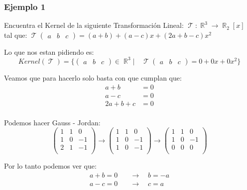 \documentclass[12pt]{report}                                    %
\DeclareMathOperator \Real {\mathbb{R}}                         %
\DeclareMathOperator \LinealTransformation {\mathcal{T}}        %
\DeclareMathOperator \LT {\mathcal{T}}                          %
\newcommand{\pVector}[1]{                                       %
        \ensuremath{\begin{pmatrix}#1\end{pmatrix}}                 %
    }
\begin{document}
            \subsubsection{Ejemplo 1}
            Encuentra el Kernel de la siguiente Transformación Lineal:
            $\LinealTransformation : \Real^3 \to \Real_2[x]$ tal que: 
            $\LinealTransformation \pVector{a&b&c} = (a+b) + (a-c)x + (2a+b-c)x^2$


            Lo que nos estan pidiendo es:
            \begin{equation*}
                Kernel(\LT) = \{ \pVector{a&b&c} \in \Real^3 |\quad \LT\pVector{a&b&c} = 0+0x+0x^2 \}
            \end{equation*}

            Veamos que para hacerlo solo basta con que cumplan que:
            \begin{equation*}
            \begin{split}
                a + b       & = 0 \\
                a - c       & = 0 \\
                2a + b + c  & = 0 \\
            \end{split}
            \end{equation*}

            Podemos hacer Gauss - Jordan:
            \begin{equation*}
                \begin{pmatrix} 1&1&0 \\ 1&0&-1 \\ 2&1&-1 \\\end{pmatrix} \to
                \begin{pmatrix} 1&1&0 \\ 1&0&-1 \\ 1&0&-1 \\\end{pmatrix} \to
                \begin{pmatrix} 1&1&0 \\ 1&0&-1 \\ 0&0&0  \\\end{pmatrix}
            \end{equation*}

            Por lo tanto podemos ver que:
            \begin{equation*}
            \begin{split}
                a + b = 0 \quad&\to\quad b = -a  \\
                a - c = 0 \quad&\to\quad c = a   \\
             \end{split}
            \end{equation*}
\end{document}
